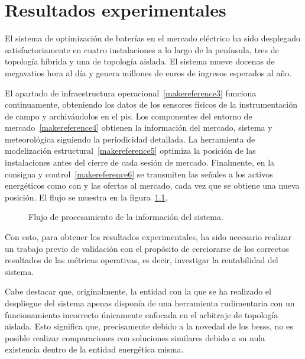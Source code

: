 \cleardoublepage

\chapter{Resultados experimentales}
\label{makereference7}

El sistema de optimización de baterías en el mercado eléctrico ha sido desplegado satisfactoriamente en cuatro instalaciones a lo largo de la península, tres de topología híbrida y una de topología aislada. El sistema mueve docenas de megavatios hora al día y genera millones de euros de ingresos esperados al año.

El apartado de infraestructura operacional~\ref{makereference3} funciona continuamente, obteniendo los datos de los sensores físicos de la instrumentación de campo y archivándolos en el \gls{pis}. Los componentes del entorno de mercado~\ref{makereference4} obtienen la información del mercado, sistema y meteorológica siguiendo la periodicidad detallada. La herramienta de modelización estructural~\ref{makereference5} optimiza la posición de las instalaciones antes del cierre de cada sesión de mercado. Finalmente, en la consigna y control~\ref{makereference6} se transmiten las señales a los activos energéticos como con y las ofertas al mercado, cada vez que se obtiene una nueva posición. El flujo se muestra en la figura~\ref{fig:flujo-procesamiento}.

\begin{figure}
  \centering
  \caption[Flujo de procesamiento de la información del sistema.]{Flujo de procesamiento de la información del sistema.}
  \label{fig:flujo-procesamiento}
\end{figure}

Con esto, para obtener los resultados experimentales, ha sido necesario realizar un trabajo previo de validación con el propósito de cerciorarse de los correctos resultados de las métricas operativas, es decir, investigar la rentabilidad del sistema.

Cabe destacar que, originalmente, la entidad con la que se ha realizado el despliegue del sistema apenas disponía de una herramienta rudimentaria con un funcionamiento incorrecto únicamente enfocada en el arbitraje de topología aislada. Esto significa que, precisamente debido a la novedad de los \glspl{bess}, no es posible realizar comparaciones con soluciones similares debido a su nula existencia dentro de la entidad energética misma.

